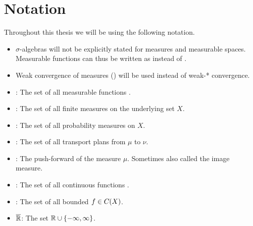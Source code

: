 \chapter*{Notation}

Throughout this thesis we will be using the following notation.

\begin{itemize}
	\item $\sigma$-algebras will not be explicitly stated for measures and measurable spaces. Measurable functions can thus be written as  instead of .
	\item Weak convergence of measures () will be used instead of weak-* convergence.
	\item {}: The set of all measurable functions .
	\item {}: The set of all finite measures on the underlying set $X$.
	\item {}: The set of all probability measures on $X$.
	\item \TP{\mu}{\nu}: The set of all transport plans from $\mu$ to $\nu$.
	\item \push{\mu}: The push-forward of the measure $\mu$. Sometimes also called the image measure.
	\item {}: The set of all continuous functions .
	\item {}: The set of all bounded $f \in C_{}(X)$.
	\item $\overline{\mathbb{R}}$: The set $\mathbb{R} \cup \{ -\infty, \infty \}$.
\end{itemize}